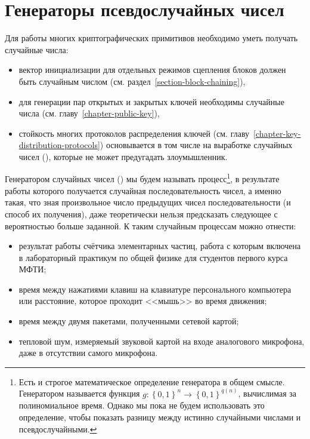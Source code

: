 \chapter{Генераторы псевдослучайных чисел}\label{chapter-generators}

Для работы многих криптографических примитивов необходимо уметь получать случайные числа:
\begin{itemize}
	\item вектор инициализации для отдельных режимов сцепления блоков должен быть случайным числом (см. раздел~\ref{section-block-chaining}),
	\item для генерации пар открытых и закрытых ключей необходимы случайные числа (см. главу~\ref{chapter-public-key}),
	\item стойкость многих протоколов распределения ключей (см. главу~\ref{chapter-key-distribution-protocols}) основывается в том числе на выработке случайных чисел (), которые не может предугадать злоумышленник.
\end{itemize}

Генератором случайных чисел () мы будем называть процесс\footnote{Есть и строгое математическое определение генератора в общем смысле. Генератором называется функция $g: \left\{0, 1\right\}^{n} \to \left\{0, 1\right\}^{q\left(n\right)}$, вычислимая за полиномиальное время. Однако мы пока не будем использовать это определение, чтобы показать разницу между истинно случайными числами и псевдослучайными.}, в результате работы которого получается случайная последовательность чисел, а именно такая, что зная произвольное число предыдущих чисел последовательности (и способ их получения), даже теоретически нельзя предсказать следующее с вероятностью больше заданной. К таким случайным процессам можно отнести:

\begin{itemize}
	\item результат работы счётчика элементарных частиц, работа с которым включена в лабораторный практикум по общей физике для студентов первого курса МФТИ;
	\item время между нажатиями клавиш на клавиатуре персонального компьютера или расстояние, которое проходит <<мышь>> во время движения;
	\item время между двумя пакетами, полученными сетевой картой;
	\item тепловой шум, измеряемый звуковой картой на входе аналогового микрофона, даже в отсутствии самого микрофона.
\end{itemize}

